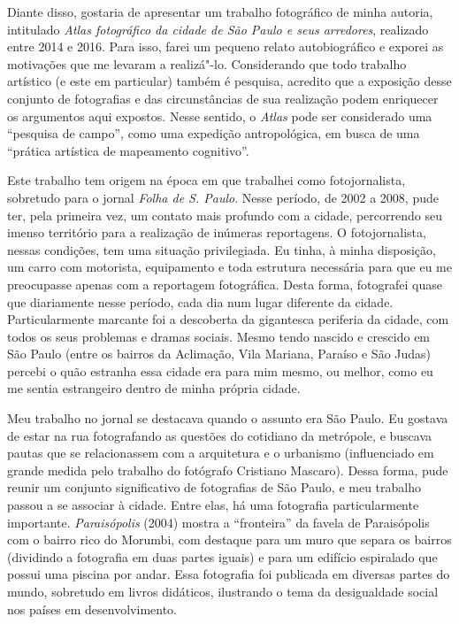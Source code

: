 Diante disso, gostaria de apresentar um trabalho fotográfico de minha
autoria, intitulado \emph{Atlas fotográfico da cidade de São Paulo e
seus arredores}, realizado entre 2014 e 2016. Para isso, farei um
pequeno relato autobiográfico e exporei as motivações que me levaram a
realizá"-lo. Considerando que todo trabalho artístico (e este em
particular) também é pesquisa, acredito que a exposição desse conjunto
de fotografias e das circunstâncias de sua realização podem enriquecer
os argumentos aqui expostos. Nesse sentido, o \emph{Atlas} pode ser
considerado uma ``pesquisa de campo'', como uma expedição antropológica,
em busca de uma ``prática artística de mapeamento cognitivo''.

Este trabalho tem origem na época em que trabalhei como fotojornalista,
sobretudo para o jornal \emph{Folha de S. Paulo}. Nesse período, de 2002
a 2008, pude ter, pela primeira vez, um contato mais profundo com a
cidade, percorrendo seu imenso território para a realização de inúmeras
reportagens. O fotojornalista, nessas condições, tem uma situação
privilegiada. Eu tinha, à minha disposição, um carro com motorista,
equipamento e toda estrutura necessária para que eu me preocupasse
apenas com a reportagem fotográfica. Desta forma, fotografei quase que
diariamente nesse período, cada dia num lugar diferente da cidade.
Particularmente marcante foi a descoberta da gigantesca periferia da
cidade, com todos os seus problemas e dramas sociais. Mesmo tendo
nascido e crescido em São Paulo (entre os bairros da Aclimação, Vila
Mariana, Paraíso e São Judas) percebi o quão estranha essa cidade era
para mim mesmo, ou melhor, como eu me sentia estrangeiro dentro de minha
própria cidade.

Meu trabalho no jornal se destacava quando o assunto era São Paulo. Eu
gostava de estar na rua fotografando as questões do cotidiano da
metrópole, e buscava pautas que se relacionassem com a arquitetura e o
urbanismo (influenciado em grande medida pelo trabalho do fotógrafo
Cristiano Mascaro). Dessa forma, pude reunir um conjunto significativo
de fotografias de São Paulo, e meu trabalho passou a se associar à
cidade. Entre elas, há uma fotografia particularmente importante.
\emph{Paraisópolis} (2004) mostra a ``fronteira'' da favela de
Paraisópolis com o bairro rico do Morumbi, com destaque para um muro que
separa os bairros (dividindo a fotografia em duas partes iguais) e para
um edifício espiralado que possui uma piscina por andar. Essa fotografia
foi publicada em diversas partes do mundo, sobretudo em livros
didáticos, ilustrando o tema da desigualdade social nos países em
desenvolvimento.

